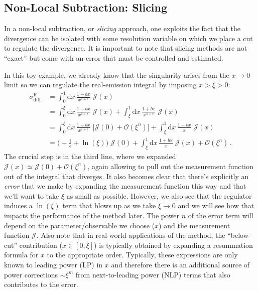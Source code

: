 \documentclass[11pt]{article}
\begin{document}
\subsection{Non-Local Subtraction: Slicing}
\label{sec:orga921d4d}
In a non-local subtraction, or \emph{slicing} approach, one exploits the fact that the divergence can be isolated with some resolution variable on which we place a cut to regulate the divergence.
It is important to note that slicing methods are not ``exact'' but come with an error that must be controlled and estimated.

In this toy example, we already know that the singularity arises from the \(x\to0\) limit so we can regulate the real-emission integral by imposing \(x > \xi > 0\):
\begin{align}
  \sigma^\mathrm{R}_\mathrm{diff.}
  &=
  \int_0^1\mathrm{d}x\,\frac{1+bx}{x^{1+\epsilon}}
  \;\mathcal{J}(x)
  \nonumber\\&=
  \int_0^\xi\mathrm{d}x\,\frac{1+bx}{x^{1+\epsilon}}
  \;\mathcal{J}(x) +
  \int_\xi^1\mathrm{d}x\,\frac{1+bx}{x^{1+\epsilon}}
  \;\mathcal{J}(x)
  \nonumber\\&=
  \int_0^\xi\mathrm{d}x\,\frac{1+bx}{x^{1+\epsilon}}
  \;\Big[\mathcal{J}(0) + \mathcal{O}(\xi^n)\Bigr]
  +\int_\xi^1\mathrm{d}x\,\frac{1+bx}{x}
  \;\mathcal{J}(x)
  \nonumber\\&=
  \biggl( -\frac{1}{\epsilon} + \ln(\xi) \biggr) \;\mathcal{J}(0)
  +\int_\xi^1\mathrm{d}x\,\frac{1+bx}{x}
  \;\mathcal{J}(x)
  + \mathcal{O}(\xi^n)
  \,.
\end{align}
The crucial step is in the third line, where we expanded \(\mathcal{J}(x) \simeq \mathcal{J}(0) + \mathcal{O}(\xi^n)\), again allowing to pull out the measurement function out of the integral that diverges.
It also becomes clear that there's explicitly an \emph{error} that we make by expanding the measurement function this way and that we'll want to take \(\xi\) as small as possible.
However, we also see that the regulator induces a \(\ln(\xi)\) term that blows up as we take \(\xi\to0\) and we will see how that impacts the performance of the method later.
The power \(n\) of the error term will depend on the parameter/observable we choose (\(x\)) and the measurement function \(\mathcal{J}\).
Also note that in real-world applications of the method, the ``below-cut'' contribution (\(x\in[0,\xi]\)) is typically obtained by expanding a resummation formula for \(x\) to the appropriate order.
Typically, these expressions are only known to leading power (LP) in \(x\) and therefore there is an additional source of power corrections \(\sim\xi^m\) from next-to-leading power (NLP) terms that also contributes to the error.
\end{document}
